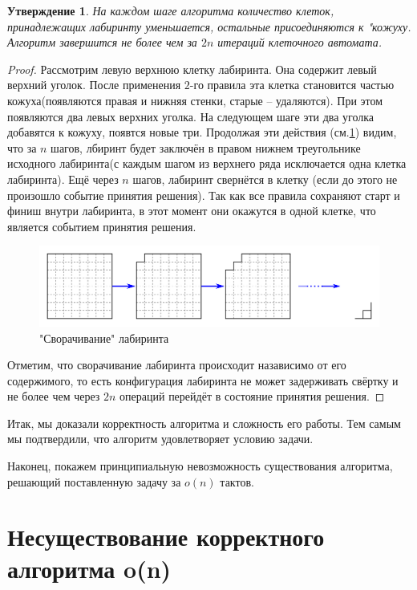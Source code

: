 \documentclass[12pt]{article}
\newtheorem*{claim*}{Утверждение}
\begin{document}
\begin{claim*}
	На каждом шаге алгоритма количество клеток, принадлежащих лабиринту уменьшается, остальные присоединяются к "кожуху. Алгоритм завершится не более чем за $2n$ итераций клеточного автомата.
\end{claim*}
\begin{proof}
	Рассмотрим левую верхнюю клетку лабиринта. Она содержит левый верхний уголок. После применения $2$-го правила эта клетка становится частью кожуха(появляются правая и нижняя стенки, старые -- удаляются). При этом появляются два левых верхних уголка. На следующем шаге эти два уголка добавятся к кожуху, появтся новые три. Продолжая эти действия (см.\ref{fig:steps}) видим, что за $n$ шагов, лбиринт будет заключён в правом нижнем треугольнике исходного лабиринта(с каждым шагом из верхнего ряда исключается одна клетка лабиринта). Ещё через $n$ шагов, лабиринт свернётся в клетку (если до этого не произошло событие принятия решения). Так как все правила сохраняют старт и финиш внутри лабиринта, в этот момент они окажутся в одной клетке, что является событием принятия решения. 
	
	\begin{figure}[H]
	 	  \centering
          \includegraphics[width=0.8\linewidth]{steps}
          \caption{"Сворачивание" лабиринта}
         \label{fig:steps}
     \end{figure}
     
Отметим, что сворачивание лабиринта  происходит назависимо от его содержимого, то есть конфигурация лабиринта не может задерживать свёртку и не более чем через $2n$ операций  перейдёт в состояние принятия решения. 
\end{proof}

Итак, мы доказали корректность алгоритма и сложность его работы. Тем самым мы подтвердили, что алгоритм удовлетворяет условию задачи.

Наконец, покажем принципиальную невозможность существования алгоритма, решающий поставленную задачу за $o(n)$ тактов.

\section*{Несуществование корректного алгоритма o(n)}
\end{document}

